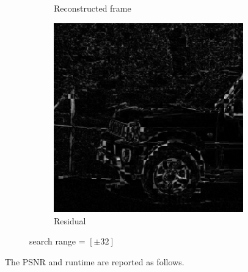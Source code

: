 \documentclass{homework}
\begin{document}
\begin{figure}[H]
\begin{subfigure}{0.32\textwidth}
        \caption{Reconstructed frame}
    \end{subfigure}
    \begin{subfigure}{0.32\textwidth}
        \centering
        \includegraphics[width=0.9\textwidth]{8_32_TSS_residual.png}
        \caption{Residual}
    \end{subfigure}
    \caption{search range = $[\pm 32]$}
\end{figure}

The PSNR and runtime are reported as follows.


\end{document}
